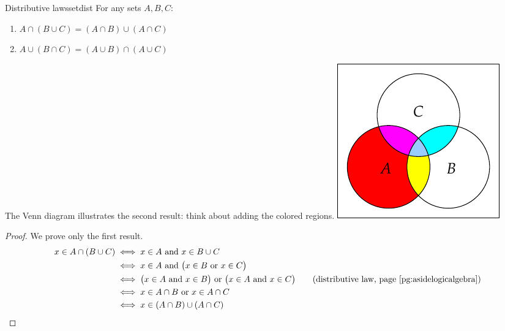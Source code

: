 \begin{thm}[lower separated=false, sidebyside, sidebyside align=top seam, sidebyside gap=0pt, righthand width=0.3\linewidth]{Distributive laws}{setdist}
	For any sets $A,B,C$:
	\begin{enumerate}\setlength{\itemsep}{2pt}
		\item $A\cap(B\cup C)=(A\cap B)\cup(A\cap C)$
		\item $A\cup(B\cap C)=(A\cup B)\cap(A\cup C)$
	\end{enumerate}
	The Venn diagram illustrates the second result: think about adding the colored regions.
	\tcblower
	\flushright\includegraphics{sets-07-venndist}
\end{thm}


\begin{proof}
	We prove only the first result.
	\begin{align*}
		x\in A\cap(B\cup C) &\iff x\in A\text{ and }x\in B\cup C\\
		&\iff x\in A \text{ and }\bigl(x\in B\text{ or }x\in C\bigr)\\
		&\iff \bigl(x\in A \text{ and }x\in B\bigr)\text{ or }\bigl(x\in A\text{ and }x\in C\bigr) \tag{distributive law, page \pageref{pg:asidelogicalgebra}}\\
		&\iff x\in A\cap B\text{ or }x\in A\cap C\\
		&\iff x\in (A\cap B)\cup(A\cap C)\tag*{\qedhere}
	\end{align*}
\end{proof}

\goodbreak

